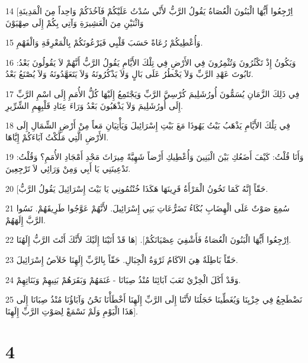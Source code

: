 \par 14 [اِرْجِعُوا أَيُّهَا الْبَنُونَ الْعُصَاةُ يَقُولُ الرَّبُّ لأَنِّي سُدْتُ عَلَيْكُمْ فَآخُذَكُمْ وَاحِداً مِنَ الْمَدِينَةِ وَاثْنَيْنِ مِنَ الْعَشِيرَةِ وَآتِي بِكُمْ إِلَى صِهْيَوْنَ
\par 15 وَأُعْطِيكُمْ رُعَاةً حَسَبَ قَلْبِي فَيَرْعُونَكُمْ بِالْمَعْرِفَةِ وَالْفَهْمِ.
\par 16 وَيَكُونُ إِذْ تَكْثُرُونَ وَتُثْمِرُونَ فِي الأَرْضِ فِي تِلْكَ الأَيَّامِ يَقُولُ الرَّبُّ أَنَّهُمْ لاَ يَقُولُونَ بَعْدُ: تَابُوتَ عَهْدِ الرَّبِّ وَلاَ يَخْطُرُ عَلَى بَالٍ وَلاَ يَذْكُرُونَهُ وَلاَ يَتَعَهَّدُونَهُ وَلاَ يُصْنَعُ بَعْدُ.
\par 17 فِي ذَلِكَ الزَّمَانِ يُسَمُّونَ أُورُشَلِيمَ كُرْسِيَّ الرَّبِّ وَيَجْتَمِعُ إِلَيْهَا كُلُّ الأُمَمِ إِلَى اسْمِ الرَّبِّ إِلَى أُورُشَلِيمَ وَلاَ يَذْهَبُونَ بَعْدُ وَرَاءَ عِنَادِ قَلْبِهِمِ الشِّرِّيرِ.
\par 18 فِي تِلْكَ الأَيَّامِ يَذْهَبُ بَيْتُ يَهُوذَا مَعَ بَيْتِ إِسْرَائِيلَ وَيَأْتِيَانِ مَعاً مِنْ أَرْضِ الشِّمَالِ إِلَى الأَرْضِ الَّتِي مَلَّكْتُ آبَاءَكُمْ إِيَّاهَا.
\par 19 وَأَنَا قُلْتُ: كَيْفَ أَضَعُكِ بَيْنَ الْبَنِينَ وَأُعْطِيكِ أَرْضاً شَهِيَّةً مِيرَاثَ مَجْدِ أَمْجَادِ الأُمَمِ؟ وَقُلْتُ: تَدْعِينَنِي يَا أَبِي وَمِنْ وَرَائِي لاَ تَرْجِعِينَ.
\par 20 [حَقّاً إِنَّهُ كَمَا تَخُونُ الْمَرْأَةُ قَرِينَهَا هَكَذَا خُنْتُمُونِي يَا بَيْتَ إِسْرَائِيلَ يَقُولُ الرَّبُّ.
\par 21 سُمِعَ صَوْتٌ عَلَى الْهِضَابِ بُكَاءُ تَضَرُّعَاتِ بَنِي إِسْرَائِيلَ. لأَنَّهُمْ عَوَّجُوا طَرِيقَهُمْ. نَسُوا الرَّبَّ إِلَهَهُمْ.
\par 22 اِرْجِعُوا أَيُّهَا الْبَنُونَ الْعُصَاةُ فَأَشْفِيَ عِصْيَانَكُمْ]. [هَا قَدْ أَتَيْنَا إِلَيْكَ لأَنَّكَ أَنْتَ الرَّبُّ إِلَهُنَا.
\par 23 حَقّاً بَاطِلَةٌ هِيَ الآكَامُ ثَرْوَةُ الْجِبَالِ. حَقّاً بِالرَّبِّ إِلَهِنَا خَلاَصُ إِسْرَائِيلَ.
\par 24 وَقَدْ أَكَلَ الْخِزْيُ تَعَبَ آبَائِنَا مُنْذُ صِبَانَا - غَنَمَهُمْ وَبَقَرَهُمْ بَنِيهِمْ وَبَنَاتِهِمْ.
\par 25 نَضْطَجِعُ فِي خِزْيِنَا وَيُغَطِّينَا خَجَلُنَا لأَنَّنَا إِلَى الرَّبِّ إِلَهِنَا أَخْطَأْنَا نَحْنُ وَآبَاؤُنَا مُنْذُ صِبَانَا إِلَى هَذَا الْيَوْمِ وَلَمْ نَسْمَعْ لِصَوْتِ الرَّبِّ إِلَهِنَا].

\chapter{4}

